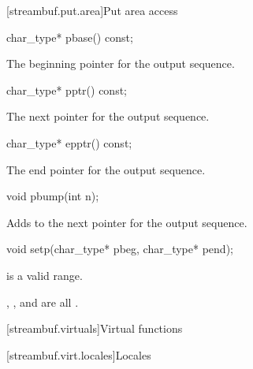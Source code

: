 [streambuf.put.area]{Put area access}

%
\begin{itemdecl}
char_type* pbase() const;
\end{itemdecl}

\begin{itemdescr}
\pnum
\returns
The beginning pointer for the output sequence.
\end{itemdescr}

%
\begin{itemdecl}
char_type* pptr() const;
\end{itemdecl}

\begin{itemdescr}
\pnum
\returns
The next pointer for the output sequence.
\end{itemdescr}

%
\begin{itemdecl}
char_type* epptr() const;
\end{itemdecl}

\begin{itemdescr}
\pnum
\returns
The end pointer for the output sequence.
\end{itemdescr}

%
\begin{itemdecl}
void pbump(int n);
\end{itemdecl}

\begin{itemdescr}
\pnum
\effects
Adds  to the next pointer for the output sequence.
\end{itemdescr}

%
\begin{itemdecl}
void setp(char_type* pbeg, char_type* pend);
\end{itemdecl}

\begin{itemdescr}
\pnum
\expects
{} is a valid range.

\pnum
\ensures
{},
,
and
 are all .
\end{itemdescr}

[streambuf.virtuals]{Virtual functions}

[streambuf.virt.locales]{Locales}

